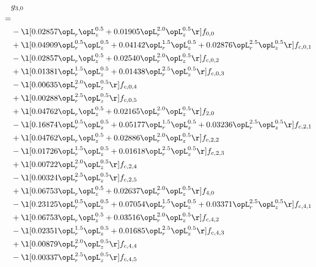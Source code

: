 \begin{alignat}{2} 
\label{eq:g_30_0} 
& g_{3,0} \nonumber \\ 
 = \\ 
& - \l[  0.02857 \opL_r \opL_z^{0.5} +  0.01905 \opL_r^{2.0} \opL_z^{0.5}  \r] f_{0,0} \nonumber \\ 
& + \l[  0.04909 \opL_r^{0.5} \opL_z^{0.5} +  0.04142 \opL_r^{1.5} \opL_z^{0.5} +  0.02876 \opL_r^{2.5} \opL_z^{0.5}  \r] f_{c,0,1} \nonumber \\ 
& - \l[  0.02857 \opL_r \opL_z^{0.5} +  0.02540 \opL_r^{2.0} \opL_z^{0.5}  \r] f_{c,0,2} \nonumber \\ 
& + \l[  0.01381 \opL_r^{1.5} \opL_z^{0.5} +  0.01438 \opL_r^{2.5} \opL_z^{0.5}  \r] f_{c,0,3} \nonumber \\ 
& - \l[  0.00635 \opL_r^{2.0} \opL_z^{0.5}  \r] f_{c,0,4} \nonumber \\ 
& + \l[  0.00288 \opL_r^{2.5} \opL_z^{0.5}  \r] f_{c,0,5} \nonumber \\ 
& + \l[  0.04762 \opL_r \opL_z^{0.5} +  0.02165 \opL_r^{2.0} \opL_z^{0.5}  \r] f_{2,0} \nonumber \\ 
& - \l[  0.16874 \opL_r^{0.5} \opL_z^{0.5} +  0.05177 \opL_r^{1.5} \opL_z^{0.5} +  0.03236 \opL_r^{2.5} \opL_z^{0.5}  \r] f_{c,2,1} \nonumber \\ 
& + \l[  0.04762 \opL_r \opL_z^{0.5} +  0.02886 \opL_r^{2.0} \opL_z^{0.5}  \r] f_{c,2,2} \nonumber \\ 
& - \l[  0.01726 \opL_r^{1.5} \opL_z^{0.5} +  0.01618 \opL_r^{2.5} \opL_z^{0.5}  \r] f_{c,2,3} \nonumber \\ 
& + \l[  0.00722 \opL_r^{2.0} \opL_z^{0.5}  \r] f_{c,2,4} \nonumber \\ 
& - \l[  0.00324 \opL_r^{2.5} \opL_z^{0.5}  \r] f_{c,2,5} \nonumber \\ 
& + \l[  0.06753 \opL_r \opL_z^{0.5} +  0.02637 \opL_r^{2.0} \opL_z^{0.5}  \r] f_{4,0} \nonumber \\ 
& - \l[  0.23125 \opL_r^{0.5} \opL_z^{0.5} +  0.07054 \opL_r^{1.5} \opL_z^{0.5} +  0.03371 \opL_r^{2.5} \opL_z^{0.5}  \r] f_{c,4,1} \nonumber \\ 
& + \l[  0.06753 \opL_r \opL_z^{0.5} +  0.03516 \opL_r^{2.0} \opL_z^{0.5}  \r] f_{c,4,2} \nonumber \\ 
& - \l[  0.02351 \opL_r^{1.5} \opL_z^{0.5} +  0.01685 \opL_r^{2.5} \opL_z^{0.5}  \r] f_{c,4,3} \nonumber \\ 
& + \l[  0.00879 \opL_r^{2.0} \opL_z^{0.5}  \r] f_{c,4,4} \nonumber \\ 
& - \l[  0.00337 \opL_r^{2.5} \opL_z^{0.5}  \r] f_{c,4,5} \nonumber \\ 
\end{alignat} 


